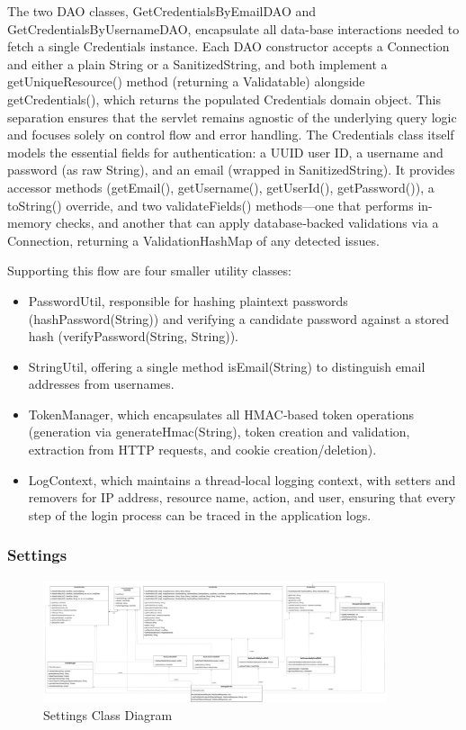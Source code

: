 The two DAO classes, GetCredentialsByEmailDAO and GetCredentialsByUsernameDAO, encapsulate all data-base interactions needed to fetch a single Credentials instance. Each DAO constructor accepts a Connection and either a plain String or a SanitizedString, and both implement a getUniqueResource() method (returning a Validatable) alongside getCredentials(), which returns the populated Credentials domain object. This separation ensures that the servlet remains agnostic of the underlying query logic and focuses solely on control flow and error handling.
The Credentials class itself models the essential fields for authentication: a UUID user ID, a username and password (as raw String), and an email (wrapped in SanitizedString). It provides accessor methods (getEmail(), getUsername(), getUserId(), getPassword()), a toString() override, and two validateFields() methods—one that performs in-memory checks, and another that can apply database‐backed validations via a Connection, returning a ValidationHashMap of any detected issues.

Supporting this flow are four smaller utility classes:
\begin{itemize}
    \item PasswordUtil, responsible for hashing plaintext passwords (hashPassword(String)) and verifying a candidate password against a stored hash (verifyPassword(String, String)).
    \item StringUtil, offering a single method isEmail(String) to distinguish email addresses from usernames.
    \item TokenManager, which encapsulates all HMAC‐based token operations (generation via generateHmac(String), token creation and validation, extraction from HTTP requests, and cookie creation/deletion).
    \item LogContext, which maintains a thread‐local logging context, with setters and removers for IP address, resource name, action, and user, ensuring that every step of the login process can be traced in the application logs.
\end{itemize}

\subsubsection{Settings}
\begin{figure}[H]
    \centering
    \includegraphics[width=0.9\textwidth]{images/class_diagrams/Settings_classdiagram.pdf}
    \caption{Settings Class Diagram}
\end{figure}


